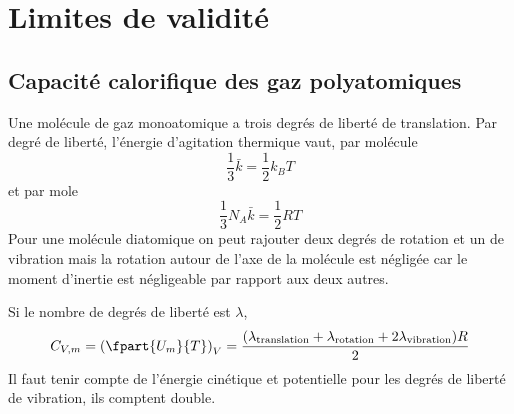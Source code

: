 \section{Limites de validité}
\subsection{Capacité calorifique des gaz polyatomiques}
Une molécule de gaz monoatomique a trois degrés de liberté de translation.
Par degré de liberté, l'énergie d'agitation thermique vaut, par molécule
\[ \frac 13 \bar k = \frac 12 k_BT \]
et par mole
\[ \frac 13 N_A \bar k = \frac 12 RT \]
Pour une molécule diatomique on peut rajouter deux degrés de rotation et
un de vibration mais la rotation autour de l'axe de la molécule est négligée
car le moment d'inertie est négligeable par rapport aux deux autres.

Si le nombre de degrés de liberté est $\lambda$,
\[ C_{V,m} = \left(\fpart{U_m}{T}\right)_V =
\frac{(\lambda_\mathrm{translation} + \lambda_\mathrm{rotation} +
2\lambda_\mathrm{vibration})R}2 \]
Il faut tenir compte de l'énergie cinétique et potentielle
pour les degrés de liberté de vibration, ils comptent double.

